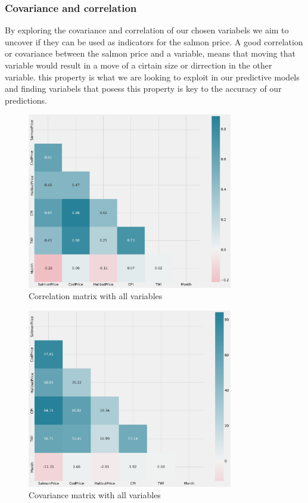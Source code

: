 \subsubsection{Covariance and correlation}\label{covariance and correlation}
By exploring the covariance and correlation of our chosen variabels we aim to uncover if they can be used as indicators for the salmon price. A good correlation or covariance between the salmon price and a variable, means that moving that variable would result in a move of a cirtain size or dirrection in the other variable. this property is what we are looking to exploit in our predictive models and finding variabels that posess this property is key to the accuracy of our predictions.
\begin{figure}[H]
    \centering
    \includegraphics[width=0.8\textwidth]{data/Figures/Descriptive/CorrMatrix.png}
    \caption[Correlation matrix]{Correlation matrix with all variables}\label{fig:CorrMatrix}
\end{figure}

\begin{figure}[H]
    \centering
    \includegraphics[width=0.8\textwidth]{data/Figures/Descriptive/CovMatrix.png}
    \caption[Covariance matrix]{Covariance matrix with all variables}\label{fig:CovMatrix}
\end{figure}


